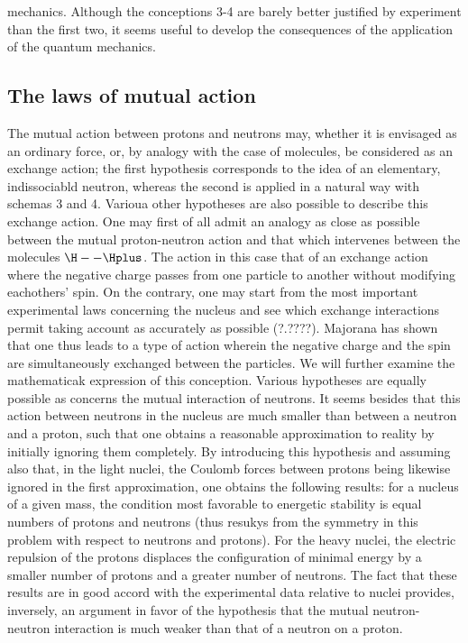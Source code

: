 \documentclass{article}
\newcommand{\bond}[2]{#1 -- #2}
\begin{document}
mechanics. Although the conceptions 3-4 are barely better justified by experiment than the first two, it seems useful to develop the consequences of the application of the quantum mechanics.
\subsection{The laws of mutual action}
The mutual action between protons and neutrons may, whether it is envisaged as an ordinary force, or, by analogy with the case of molecules, be considered as an exchange action; the first hypothesis corresponds to the idea of an elementary, indissociabld neutron, whereas the second is applied in a natural way with schemas 3 and 4. Varioua other hypotheses are also possible to describe this exchange action. One may first of all admit an analogy as close as possible between the mutual proton-neutron action and that which intervenes between the molecules $\bond{\H}{\Hplus}$. The action in this case that of an exchange action where the negative charge passes from one particle to another without modifying eachothers' spin. On the contrary, one may start from the most important experimental laws concerning the nucleus and see which exchange interactions permit taking account as accurately as possible (?.????). Majorana has shown that one thus leads to a type of action wherein the negative charge and the spin are simultaneously exchanged between the particles. We will further examine the mathematicak expression of this conception.
Various hypotheses are equally possible as concerns the mutual interaction of neutrons. It seems besides that this action between neutrons in the nucleus are much smaller than between a neutron and a proton, such that one obtains a reasonable approximation to reality by initially ignoring them completely.
By introducing this hypothesis and assuming also that, in the light nuclei, the Coulomb forces between protons being likewise ignored in the first approximation, one obtains the following results: for a nucleus of a given mass, the condition most favorable to energetic stability is equal numbers of protons and neutrons (thus resukys from the symmetry in this problem with respect to neutrons and protons). For the heavy nuclei, the electric repulsion of the protons displaces the configuration of minimal energy by a smaller number of protons and a greater number of neutrons. The fact that these results are in good accord with the experimental data relative to nuclei provides, inversely, an argument in favor of the hypothesis that the mutual neutron-neutron interaction is much weaker than that of a neutron on a proton.
\end{document}
